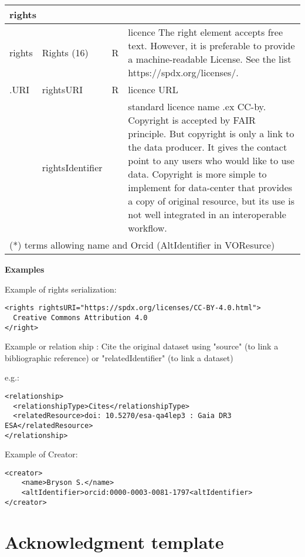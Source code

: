 \documentclass[11pt,a4paper]{ivoa}
\begin{document}
\begin{tabular}{|l|p{5cm}|l|p{5cm}|}
\multicolumn{4}{|l|}{\textbf{rights}} \\ \hline
rights   & Rights (16)& R& licence
          The right element accepts free text. However, it is preferable to provide a machine-readable License. See the list https://spdx.org/licenses/.
         \\ \hline
.URI     & rightsURI & R& licence URL\\ \hline
         & rightsIdentifier & & standard licence name .ex CC-by.
         Copyright is accepted by FAIR principle. But copyright is only a link to the data producer. It gives the contact point to any users who would like to use data. Copyright is more simple to implement for data-center that provides a copy of original resource, but its use is not well integrated in an interoperable workflow.
         \\ \hline
\multicolumn{4}{l}{(*) terms allowing name and Orcid (AltIdentifier in VOResurce)} \\ \hline
\end{tabular}




\textbf{Examples}

Example of rights serialization:
\begin{verbatim}
<rights rightsURI="https://spdx.org/licenses/CC-BY-4.0.html">
  Creative Commons Attribution 4.0
</right>
\end{verbatim}


Example or relation ship : 
Cite the original dataset using "source" (to link a bibliographic reference) or "relatedIdentifier" (to link a dataset)

e.g.:
\begin{verbatim}
<relationship>
  <relationshipType>Cites</relationshipType>
  <relatedResource>doi: 10.5270/esa-qa4lep3 : Gaia DR3 ESA</relatedResource> 
</relationship>
\end{verbatim}

Example of Creator:
\begin{verbatim}
<creator>
	<name>Bryson S.</name>
	<altIdentifier>orcid:0000-0003-0081-1797<altIdentifier>
</creator>
\end{verbatim}

%

\section{Acknowledgment template}
\end{document}
